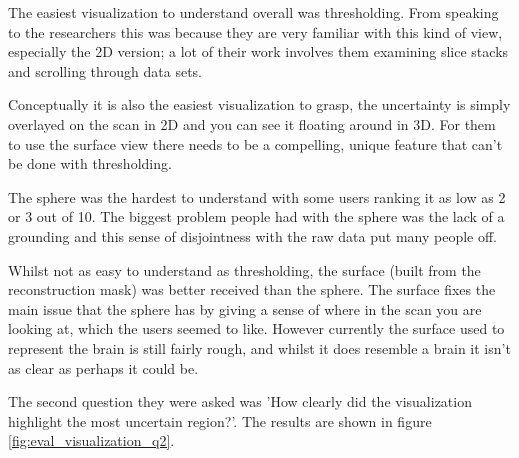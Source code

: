 The easiest visualization to understand overall was thresholding. From speaking to the researchers this was because they are very familiar with this kind of view, especially the 2D version; a lot of their work involves them examining slice stacks and scrolling through data sets.

Conceptually it is also the easiest visualization to grasp, the uncertainty is simply overlayed on the scan in 2D and you can see it floating around in 3D. For them to use the surface view there needs to be a compelling, unique feature that can't be done with thresholding.

The sphere was the hardest to understand with some users ranking it as low as 2 or 3 out of 10. The biggest problem people had with the sphere was the lack of a grounding and this sense of disjointness with the raw data put many people off.

Whilst not as easy to understand as thresholding, the surface (built from the reconstruction mask) was better received than the sphere. The surface fixes the main issue that the sphere has by giving a sense of where in the scan you are looking at, which the users seemed to like. However currently the surface used to represent the brain is still fairly rough, and whilst it does resemble a brain it isn't as clear as perhaps it could be.

The second question they were asked was 'How clearly did the visualization highlight the most uncertain region?'. The results are shown in figure \ref{fig:eval_visualization_q2}.


